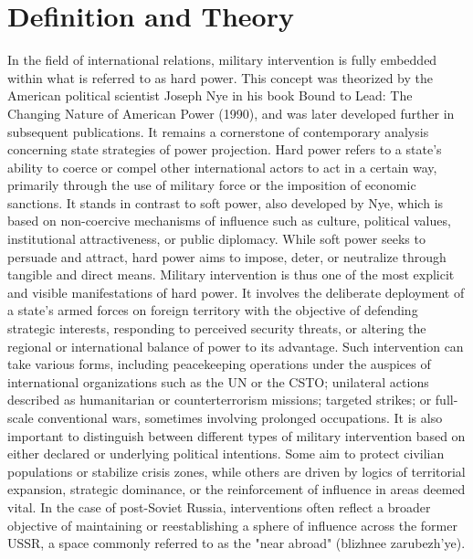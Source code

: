 \documentclass[12pt]{article}
\begin{document}

\section*{Definition and Theory}

In the field of international relations, military intervention is fully embedded within what is referred to as hard power. This concept was theorized by the American political scientist Joseph Nye in his book Bound to Lead: The Changing Nature of American Power (1990), and was later developed further in subsequent publications. It remains a cornerstone of contemporary analysis concerning state strategies of power projection.
Hard power refers to a state's ability to coerce or compel other international actors to act in a certain way, primarily through the use of military force or the imposition of economic sanctions. It stands in contrast to soft power, also developed by Nye, which is based on non-coercive mechanisms of influence such as culture, political values, institutional attractiveness, or public diplomacy. While soft power seeks to persuade and attract, hard power aims to impose, deter, or neutralize through tangible and direct means.
Military intervention is thus one of the most explicit and visible manifestations of hard power. It involves the deliberate deployment of a state's armed forces on foreign territory with the objective of defending strategic interests, responding to perceived security threats, or altering the regional or international balance of power to its advantage. Such intervention can take various forms, including peacekeeping operations under the auspices of international organizations such as the UN or the CSTO; unilateral actions described as humanitarian or counterterrorism missions; targeted strikes; or full-scale conventional wars, sometimes involving prolonged occupations.
It is also important to distinguish between different types of military intervention based on either declared or underlying political intentions. Some aim to protect civilian populations or stabilize crisis zones, while others are driven by logics of territorial expansion, strategic dominance, or the reinforcement of influence in areas deemed vital. In the case of post-Soviet Russia, interventions often reflect a broader objective of maintaining or reestablishing a sphere of influence across the former USSR, a space commonly referred to as the "near abroad" (blizhnee zarubezh’ye).
\end{document}
